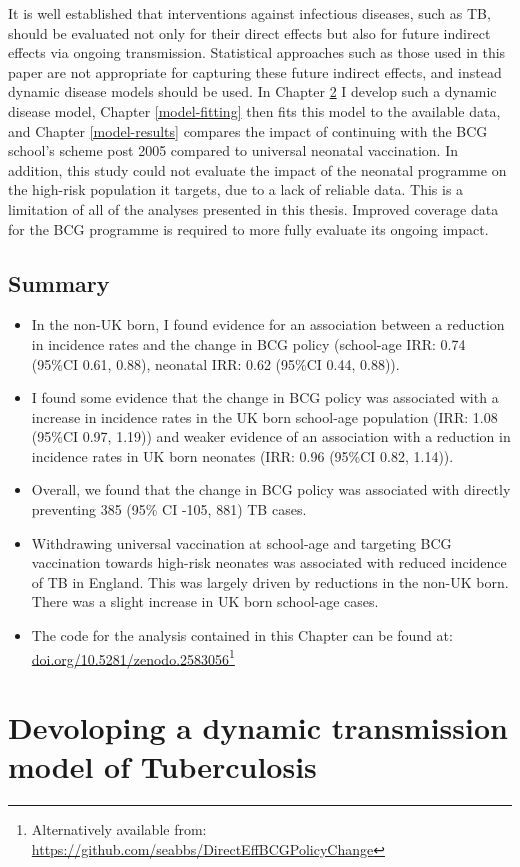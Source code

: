 \documentclass[11pt,twoside]{bristolthesis}
\begin{document}
  It is well established that interventions against infectious diseases, such as TB, should be evaluated not only for their direct effects but also for future indirect effects via ongoing transmission. Statistical approaches such as those used in this paper are not appropriate for capturing these future indirect effects, and instead dynamic disease models should be used. In Chapter \ref{model-development} I develop such a dynamic disease model, Chapter \ref{model-fitting} then fits this model to the available data, and Chapter \ref{model-results} compares the impact of continuing with the BCG school's scheme post 2005 compared to universal neonatal vaccination. In addition, this study could not evaluate the impact of the neonatal programme on the high-risk population it targets, due to a lack of reliable data. This is a limitation of all of the analyses presented in this thesis. Improved coverage data for the BCG programme is required to more fully evaluate its ongoing impact.
  
  \hypertarget{summary-6}{%
  \section{Summary}\label{summary-6}}
  \begin{itemize}
  \item
    In the non-UK born, I found evidence for an association between a reduction in incidence rates and the change in BCG policy (school-age IRR: 0.74 (95\%CI 0.61, 0.88), neonatal IRR: 0.62 (95\%CI 0.44, 0.88)).
  \item
    I found some evidence that the change in BCG policy was associated with a increase in incidence rates in the UK born school-age population (IRR: 1.08 (95\%CI 0.97, 1.19)) and weaker evidence of an association with a reduction in incidence rates in UK born neonates (IRR: 0.96 (95\%CI 0.82, 1.14)).
  \item
    Overall, we found that the change in BCG policy was associated with directly preventing 385 (95\% CI -105, 881) TB cases.
  \item
    Withdrawing universal vaccination at school-age and targeting BCG vaccination towards high-risk neonates was associated with reduced incidence of TB in England. This was largely driven by reductions in the non-UK born. There was a slight increase in UK born school-age cases.
  \item
    The code for the analysis contained in this Chapter can be found at: \url{doi.org/10.5281/zenodo.2583056}\footnote{Alternatively available from: \url{https://github.com/seabbs/DirectEffBCGPolicyChange}}
  \end{itemize}
  \hypertarget{model-development}{%
  \chapter{Devoloping a dynamic transmission model of Tuberculosis}\label{model-development}}
  
\end{document}
